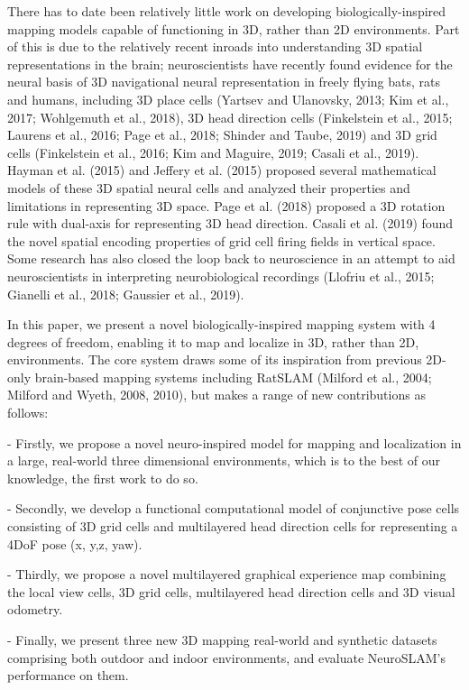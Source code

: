 There has to date been relatively little work on developing biologically-inspired mapping models capable of functioning in 3D, rather than 2D environments. 
Part of this is due to the relatively recent inroads into understanding 3D spatial representations in the brain; neuroscientists have recently found evidence for the neural basis of 3D navigational neural representation in freely flying bats, rats and humans, including 3D place cells (Yartsev and Ulanovsky, 2013; Kim et al., 2017; Wohlgemuth et al., 2018), 3D head direction cells (Finkelstein et al., 2015; Laurens et al., 2016; Page et al., 2018; Shinder and Taube, 2019) and 3D grid cells (Finkelstein et al., 2016; Kim and Maguire, 2019; Casali et al., 2019). 
Hayman et al. (2015) and Jeffery et al. (2015) proposed several mathematical models of these 3D spatial neural cells and analyzed their properties and limitations in representing 3D space. 
Page et al. (2018) proposed a 3D rotation rule with dual-axis for representing 3D head direction. 
Casali et al. (2019) found the novel spatial encoding properties of grid cell firing fields in vertical space. 
Some research has also closed the loop back to neuroscience in an attempt to aid neuroscientists in interpreting neurobiological recordings (Llofriu et al., 2015; Gianelli et al., 2018; Gaussier et al., 2019).


In this paper, we present a novel biologically-inspired mapping system with 4 degrees of freedom, enabling it to map and localize in 3D, rather than 2D, environments. 
The core system draws some of its inspiration from previous 2D-only brain-based mapping systems including RatSLAM (Milford et al., 2004; Milford and Wyeth, 2008, 2010), but makes a range of new contributions as follows:

- Firstly, we propose a novel neuro-inspired model for mapping and localization in a large, real-world three dimensional environments, which is to the best of our knowledge, the first work to do so.

- Secondly, we develop a functional computational model of conjunctive pose cells consisting of 3D grid cells and multilayered head direction cells for representing a 4DoF pose (x, y,z, yaw).

- Thirdly, we propose a novel multilayered graphical experience map combining the local view cells, 3D grid cells, multilayered head direction cells and 3D visual odometry.

- Finally, we present three new 3D mapping real-world and synthetic datasets comprising both outdoor and indoor environments, and evaluate NeuroSLAM’s performance on them.


